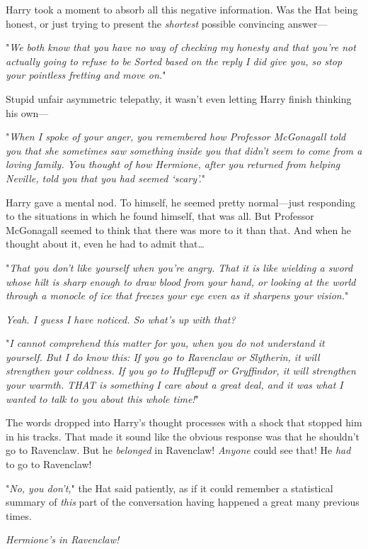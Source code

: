 Harry took a moment to absorb all this negative information. Was the Hat being 
honest, or just trying to present the \emph{shortest} possible convincing 
answer---

"\emph{We both know that you have no way of checking my honesty and that you're 
not actually going to refuse to be Sorted based on the reply I did give you, so 
stop your pointless fretting and move on.}"

Stupid unfair asymmetric telepathy, it wasn't even letting Harry finish 
thinking his own---

"\emph{When I spoke of your anger, you remembered how Professor McGonagall told 
you that she sometimes saw something inside you that didn't seem to come from a 
loving family. You thought of how Hermione, after you returned from helping 
Neville, told you that you had seemed `scary'.}"

Harry gave a mental nod. To himself, he seemed pretty normal---just responding 
to the situations in which he found himself, that was all. But Professor 
McGonagall seemed to think that there was more to it than that. And when he 
thought about it, even he had to admit that{\ldots}

"\emph{That you don't like yourself when you're angry. That it is like wielding 
a sword whose hilt is sharp enough to draw blood from your hand, or looking at 
the world through a monocle of ice that freezes your eye even as it sharpens 
your vision.}"

\emph{Yeah. I guess I have noticed. So what's up with that?}

"\emph{I cannot comprehend this matter for you, when you do not understand it 
yourself. But I do know this: If you go to Ravenclaw or Slytherin, it will 
strengthen your coldness. If you go to Hufflepuff or Gryffindor, it will 
strengthen your warmth. THAT is something I care about a great deal, and it was 
what I wanted to talk to you about this whole time!}"

The words dropped into Harry's thought processes with a shock that stopped him 
in his tracks. That made it sound like the obvious response was that he 
shouldn't go to Ravenclaw. But he \emph{belonged} in Ravenclaw! \emph{Anyone} 
could see that! He \emph{had} to go to Ravenclaw!

"\emph{No, you don't,}" the Hat said patiently, as if it could remember a 
statistical summary of \emph{this} part of the conversation having happened a 
great many previous times.

\emph{Hermione's in Ravenclaw!}

